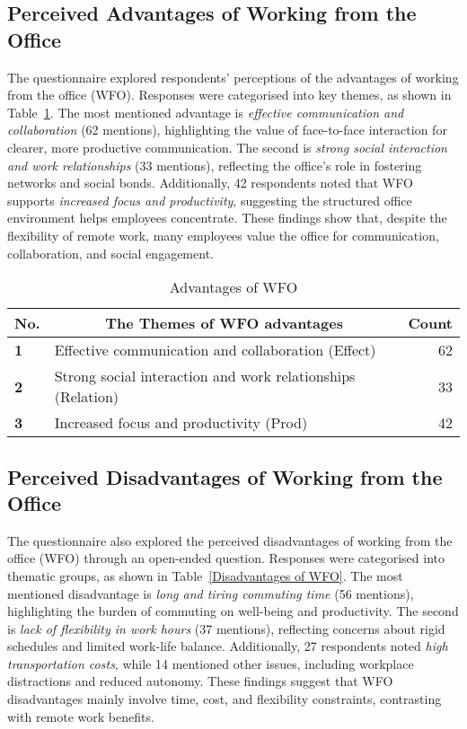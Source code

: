 \documentclass[conference]{IEEEtran}
\begin{document}
\subsection{Perceived Advantages of Working from the Office}
\label{sec:advantage-wfo}

The questionnaire explored respondents' perceptions of the advantages of working from the office (WFO). Responses were categorised into key themes, as shown in Table~\ref{Advanatage of WFO}. The most mentioned advantage is \textit{effective communication and collaboration} (62 mentions), highlighting the value of face-to-face interaction for clearer, more productive communication. The second is \textit{strong social interaction and work relationships} (33 mentions), reflecting the office's role in fostering networks and social bonds. Additionally, 42 respondents noted that WFO supports \textit{increased focus and productivity}, suggesting the structured office environment helps employees concentrate. These findings show that, despite the flexibility of remote work, many employees value the office for communication, collaboration, and social engagement.



\begin{table}[ht]
	\caption{Advantages of WFO}
	\label{Advanatage of WFO}
	\begin{tabular}{|p{}|p{}|r|}
		\hline
		\multicolumn{1}{|c|}{\textbf{No.}} & \multicolumn{1}{c|}{\textbf{The Themes of WFO advantages}} & \multicolumn{1}{c|}{\textbf{Count}} \\ \hline
		\textbf{1}             & Effective communication and collaboration (Effect)     & 62 %
		\\ \hline
		\textbf{2}             & Strong social interaction and work relationships (Relation)& 33 %
		\\ \hline
		\textbf{3}             & Increased focus and productivity (Prod)        & 42 %
		\\ \hline
	\end{tabular}
\end{table}

\subsection{Perceived Disadvantages of Working from the Office}
\label{sec:disadvantage-wfo}

The questionnaire also explored the perceived disadvantages of working from the office (WFO) through an open-ended question. Responses were categorised into thematic groups, as shown in Table~\ref{Disadvantages of WFO}. The most mentioned disadvantage is \textit{long and tiring commuting time} (56 mentions), highlighting the burden of commuting on well-being and productivity. The second is \textit{lack of flexibility in work hours} (37 mentions), reflecting concerns about rigid schedules and limited work-life balance. Additionally, 27 respondents noted \textit{high transportation costs}, while 14 mentioned other issues, including workplace distractions and reduced autonomy. These findings suggest that WFO disadvantages mainly involve time, cost, and flexibility constraints, contrasting with remote work benefits.
\end{document}
